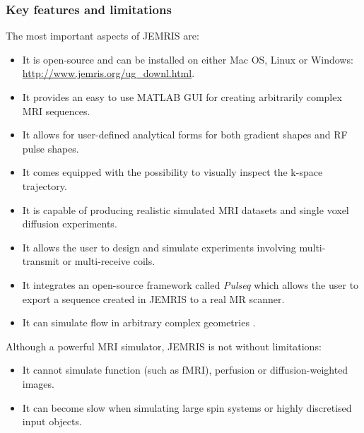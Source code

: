 \subsubsection{Key features and limitations}
The most important aspects of JEMRIS are:
\begin{itemize}
    
    \item It is open-source and can be installed on either Mac OS, Linux or Windows: \url{http://www.jemris.org/ug_downl.html}.
    
    \item It provides an easy to use MATLAB GUI for creating arbitrarily complex MRI sequences.
    
    \item It allows for user-defined analytical forms for both gradient shapes and RF pulse shapes. 
    
    \item It comes equipped with the possibility to visually inspect the k-space trajectory.
    
    \item It is capable of producing realistic simulated MRI datasets and single voxel diffusion experiments.
    
    \item It allows the user to design and simulate experiments involving multi-transmit or multi-receive coils.
    
    \item It integrates an open-source framework called \textit{Pulseq} \cite{Layton2017} which allows the user to export a sequence created in JEMRIS to a real MR scanner.
    
    \item It can simulate flow in arbitrary complex geometries \cite{Fortin2016}.
    
\end{itemize}

\hfill

Although a powerful MRI simulator, JEMRIS is not without limitations:
\begin{itemize}
    
    \item It cannot simulate function (such as fMRI), perfusion or diffusion-weighted images.
    
    \item It can become slow when simulating large spin systems or highly discretised input objects. 
    
\end{itemize}


